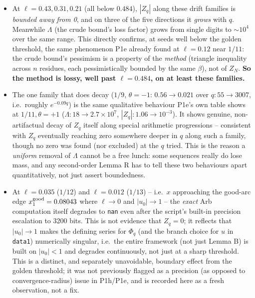 \documentclass[11pt]{article}
\theoremstyle{remark}\newtheorem{remark}[theorem]{Remark}
\begin{document}
\begin{itemize}
\item At $\ell=0.43,0.31,0.21$ (all below $0.484$), $|Z_q|$ along these drift families is \emph{bounded away from 0}, and on three of the five directions it \emph{grows} with $q$. Meanwhile $\Lambda$ (the crude bound's loss factor) grows from single digits to $\sim10^4$ over the same range. This directly confirms, at seeds well below the golden threshold, the same phenomenon P1e already found at $\ell=0.12$ near $1/11$: the crude bound's pessimism is a property of the \emph{method} (triangle inequality across $n$ residues, each pessimistically bounded by the same $\beta$), not of $Z_N$. \textbf{So the method is lossy, well past $\ell=0.484$, on at least these families.}
\item The one family that does decay ($1/9$, $\theta=-1$: $0.56\to0.021$ over $q:55\to3007$, i.e.\ roughly $e^{-0.09q}$) is the same qualitative behaviour P1e's own table shows at $1/11,\theta{=}+1$ ($\Lambda:18\to2.7\times10^7$, $|Z_q|:1.06\to10^{-3}$). It shows genuine, non-artifactual decay of $Z_q$ itself along special arithmetic progressions -- consistent with $Z_q$ eventually reaching zero somewhere deeper in $q$ along such a family, though no zero was found (nor excluded) at the $q$ tried. This is the reason a \emph{uniform} removal of $\Lambda$ cannot be a free lunch: some sequences really do lose mass, and any second-order Lemma R has to tell these two behaviours apart quantitatively, not just assert boundedness.
\item At $\ell=0.035$ ($1/12$) and $\ell=0.012$ ($1/13$) -- i.e.\ $x$ approaching the good-arc edge $x_1^{\rm good}=0.08043$ where $\ell\to0$ and $|u_0|\to1$ -- the \emph{exact} Arb computation itself degrades to \texttt{nan} even after the script's built-in precision escalation to 3200 bits. This is not evidence that $Z_q=0$; it reflects that $|u_0|\to1$ makes the defining series for $\Phi_q$ (and the branch choice for $u$ in \texttt{data1}) numerically singular, i.e.\ the entire framework (not just Lemma B) is built on $|u_0|<1$ and degrades continuously, not just at a sharp threshold. This is a distinct, and separately unavoidable, boundary effect from the golden threshold; it was not previously flagged as a precision (as opposed to convergence-radius) issue in P1h/P1e, and is recorded here as a fresh observation, not a fix.
\end{itemize}
\end{document}
